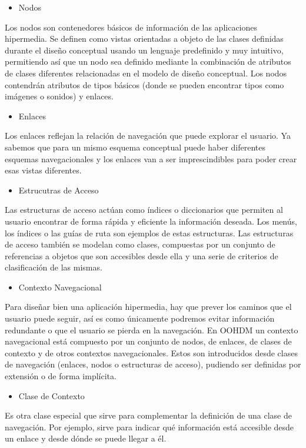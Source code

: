 \begin{itemize}
\item Nodos
\end{itemize}
{\large Los nodos son contenedores básicos de información de las aplicaciones hipermedia. Se definen como vistas orientadas a objeto de las clases definidas durante el diseño conceptual usando un lenguaje predefinido y muy intuitivo, permitiendo así que un nodo sea definido mediante la combinación de atributos de clases diferentes relacionadas en el modelo de diseño conceptual. Los nodos contendrán atributos de tipos básicos (donde se pueden encontrar tipos como imágenes o sonidos) y enlaces.}\\
\begin{itemize}
\item Enlaces 
\end{itemize}
{\large  Los enlaces reflejan la relación de navegación que puede explorar el usuario. Ya sabemos que para un mismo esquema conceptual puede haber diferentes esquemas navegacionales y los enlaces van a ser imprescindibles para poder crear esas vistas diferentes.}\\
\begin{itemize}
\item Estrucutras de Acceso
\end{itemize}
{\large Las estructuras de acceso actúan como índices o diccionarios que permiten al usuario encontrar de forma rápida y eficiente la información deseada. Los menús, los índices o las guías de ruta son ejemplos de estas estructuras. Las estructuras de acceso también se modelan como clases, compuestas por un conjunto de referencias a objetos que son accesibles desde ella y una serie de criterios de clasificación de las mismas.}\\
\begin{itemize}
\item Contexto Navegacional
\end{itemize}
{\large Para diseñar bien una aplicación hipermedia, hay que prever los caminos que el usuario puede seguir, así es como únicamente podremos evitar información redundante o que el usuario se pierda en la navegación. En OOHDM un contexto navegacional está compuesto por un conjunto de nodos, de enlaces, de clases de contexto y de otros contextos navegacionales. Estos son introducidos desde clases de navegación (enlaces, nodos o estructuras de acceso), pudiendo ser definidas por extensión o de forma implícita.}\\
\begin{itemize}
\item Clase de Contexto
\end{itemize}
{\large Es otra clase especial que sirve para complementar la definición de una clase de navegación. Por ejemplo, sirve para indicar qué información está accesible desde un enlace y desde dónde se puede llegar a él.}\\

